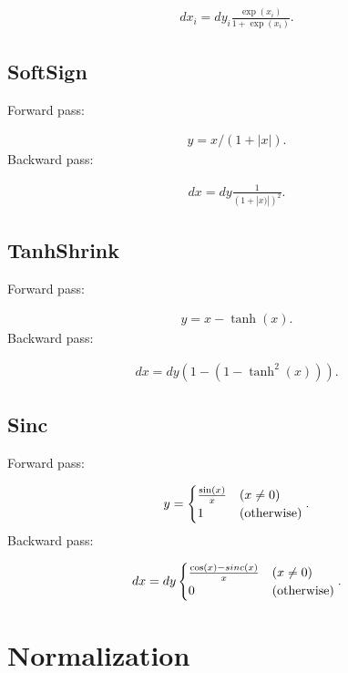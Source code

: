 \documentclass{article}
\begin{document}
\begin{eqnarray}
  dx_i = dy_i \frac{\exp(x_i)}{1 + \exp(x_i)}.
\end{eqnarray}

\subsection{SoftSign}

Forward pass:

\begin{eqnarray}
  y = x/(1+|x|).    
\end{eqnarray}
%
Backward pass:

\begin{eqnarray}
  dx = dy \frac{1}{(1 + |x)|)^2}.
\end{eqnarray}


\subsection{TanhShrink}

Forward pass:

\begin{eqnarray}
  y = x - \tanh(x).    
\end{eqnarray}
%
Backward pass:

\begin{eqnarray}
  dx = dy \left(1 - (1 - \tanh^2(x))\right).
\end{eqnarray}

\subsection{Sinc}

Forward pass:

\begin{eqnarray}
  y = \begin{cases}
     \frac{\sin(x)}{x} & (x \neq 0) \\
     1 & ({\rm otherwise})
  \end{cases}. 
\end{eqnarray}
%
Backward pass:

\begin{eqnarray}
  dx = dy \begin{cases}
     \frac{\cos(x)  - sinc(x)}{x} & (x \neq 0) \\
     0 & ({\rm otherwise})
  \end{cases}. \end{eqnarray}


\section{Normalization}
\label{sec:Normalization}
\end{document}
